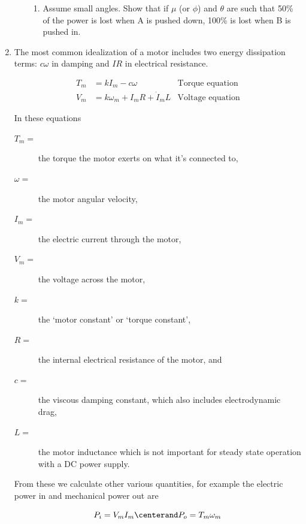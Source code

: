 \begin{enumerate}
\begin{enumerate}
\begin{enumerate}
 \item Assume small angles.  Show that if $\mu$ (or $\phi$) and $\theta$ are
 such that 50\% of the power is lost when A is pushed down, 100\% is lost when B is pushed in.
 
\end{enumerate}
\end{enumerate}

\par

\item  The most common idealization of a motor includes two energy dissipation terms:
$c\omega$ in damping and $IR$ in electrical resistance.

\begin{align}
T_{m} &=  k I_{m}  - c \omega & \textrm{Torque equation}\label{firstmotoreq}\\
V_{m} &= k \omega_{m} + I_{m} R + \dot I_{m} L & \textrm{Voltage equation} \label{secondmotoreq}
\end{align}


In these equations\par
\begin{center}
  \parbox{4 in}{
\begin{description}
\item[$T_m = $] the torque the motor exerts on what it's connected to,
\item[$\omega = $] the motor angular velocity, 
\item[$I_{m} = $] the electric current through the motor, 
\item[$V_{m} = $] the voltage across the motor,
\item[$k = $] the `motor constant' or
`torque constant',  
\item[$R = $] the internal electrical resistance of the motor, and
\item[$c = $] the viscous damping constant, which also includes electrodynamic
drag,
\item[$L = $] the motor inductance which is not important for steady state operation with a DC power supply.
\end{description}
}

\end{center}

\par
From these we calculate other various quantities, for example the electric power in  and mechanical power out are 

\begin{equation}
P_{i} = V_{m} I_{m}  \centerand P_{o} = T_{m} \omega_{m}
\end{equation}



\end{enumerate}
